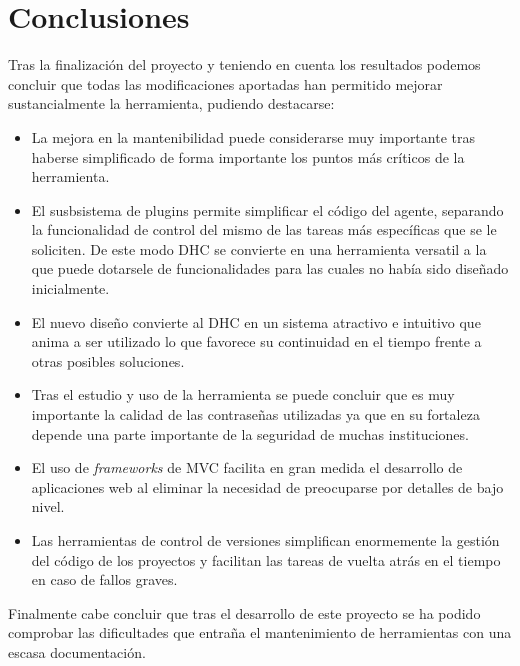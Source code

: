 \chapter{Conclusiones}

Tras la finalización del proyecto y teniendo en cuenta los resultados podemos concluir que todas las modificaciones aportadas han permitido mejorar sustancialmente la herramienta, pudiendo destacarse:

\begin{itemize}
	\item La mejora en la mantenibilidad puede considerarse muy importante tras haberse simplificado de forma importante los puntos más críticos de la herramienta.
	
	\item El susbsistema de plugins permite simplificar el código del agente, separando la funcionalidad de control del mismo de las tareas más específicas que se le soliciten. De este modo DHC se convierte en una herramienta versatil a la que puede dotarsele de funcionalidades para las cuales no había sido diseñado inicialmente.
	
	\item El nuevo diseño convierte al DHC en un sistema atractivo e intuitivo que anima a ser utilizado lo que favorece su continuidad en el tiempo frente a otras posibles soluciones.
	
	\item Tras el estudio y uso de la herramienta se puede concluir que es muy importante la calidad de las contraseñas utilizadas ya que en su fortaleza depende una parte importante de la seguridad de muchas instituciones.
	
	\item El uso de \emph{frameworks} de MVC facilita en gran medida el desarrollo de aplicaciones web al eliminar la necesidad de preocuparse por detalles de bajo nivel.
	
	\item Las herramientas de control de versiones simplifican enormemente la gestión del código de los proyectos y facilitan las tareas de vuelta atrás en el tiempo en caso de fallos graves.
\end{itemize}

Finalmente cabe concluir que tras el desarrollo de este proyecto se ha podido comprobar las dificultades que entraña el mantenimiento de herramientas con una escasa documentación.